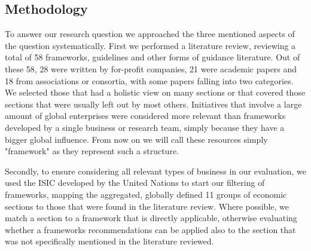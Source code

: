 






\subsection{Methodology}

To answer our research question we approached the three mentioned aspects of the question systematically. First we performed a literature review, reviewing a total of 58 frameworks, guidelines and other forms of guidance literature. Out of these 58, 28 were written by for-profit companies, 21 were academic papers and 18 from associations or consortia, with some papers falling into two categories.  
We selected those that had a holistic view on many sections or that covered those sections that were usually left out by most others. Initiatives that involve a large amount of global enterprises were considered more relevant than frameworks developed by a single business or research team, simply because they have a bigger global influence. From now on we will call these resources simply "framework" as they represent such a structure.

Secondly, to ensure considering all relevant types of business in our evaluation, we used the \ac{ISIC} developed by the United Nations to start our filtering of frameworks, mapping the aggregated, globally defined 11 groups of economic sections \cite[p.274f.]{ISIC:2008} to those that were found in the literature review. Where possible, we match a section to a framework that is directly applicable, otherwise evaluating whether a frameworks recommendations can be applied also to the section that was not specifically mentioned in the literature reviewed. 

